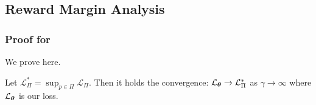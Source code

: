 \subsection{Reward Margin Analysis}
\subsubsection{Proof for }
\label{sec:proof2}
We prove  here.

\begin{theorem*}
Let $\mathcal{L}_{\Pi}^{*} = \sup_{p\in\Pi} \mathcal{L}_{\Pi}$. Then it holds the convergence:  $\mathcal{L}_{{\boldsymbol{\theta}}} \rightarrow \mathcal{L}_{\Pi}^{*}$ as $\gamma\rightarrow \infty$ where $\mathcal{L}_{{\boldsymbol{\theta}}}$ is our   loss. 
\end{theorem*}

